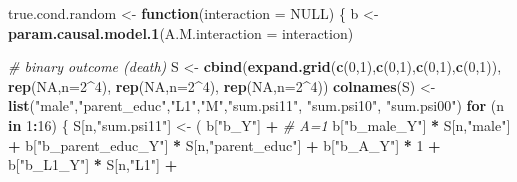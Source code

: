 \documentclass[
]{book}
\newenvironment{Shaded}{\begin{snugshade}}{\end{snugshade}}
\newcommand{\AttributeTok}[1]{\textcolor[rgb]{0.13,0.29,0.53}{#1}}
\newcommand{\CommentTok}[1]{\textcolor[rgb]{0.56,0.35,0.01}{\textit{#1}}}
\newcommand{\ConstantTok}[1]{\textcolor[rgb]{0.56,0.35,0.01}{#1}}
\newcommand{\ControlFlowTok}[1]{\textcolor[rgb]{0.13,0.29,0.53}{\textbf{#1}}}
\newcommand{\DecValTok}[1]{\textcolor[rgb]{0.00,0.00,0.81}{#1}}
\newcommand{\FunctionTok}[1]{\textcolor[rgb]{0.13,0.29,0.53}{\textbf{#1}}}
\newcommand{\NormalTok}[1]{#1}
\newcommand{\OtherTok}[1]{\textcolor[rgb]{0.56,0.35,0.01}{#1}}
\newcommand{\SpecialCharTok}[1]{\textcolor[rgb]{0.81,0.36,0.00}{\textbf{#1}}}
\newcommand{\StringTok}[1]{\textcolor[rgb]{0.31,0.60,0.02}{#1}}
\begin{document}
\begin{Shaded}
\begin{Highlighting}[]
\NormalTok{true.cond.random }\OtherTok{\textless{}{-}} \ControlFlowTok{function}\NormalTok{(}\AttributeTok{interaction =} \ConstantTok{NULL}\NormalTok{) \{}
\NormalTok{  b }\OtherTok{\textless{}{-}} \FunctionTok{param.causal.model.1}\NormalTok{(}\AttributeTok{A.M.interaction =}\NormalTok{ interaction)}
  
  \CommentTok{\# binary outcome (death)}
\NormalTok{  S }\OtherTok{\textless{}{-}} \FunctionTok{cbind}\NormalTok{(}\FunctionTok{expand.grid}\NormalTok{(}\FunctionTok{c}\NormalTok{(}\DecValTok{0}\NormalTok{,}\DecValTok{1}\NormalTok{),}\FunctionTok{c}\NormalTok{(}\DecValTok{0}\NormalTok{,}\DecValTok{1}\NormalTok{),}\FunctionTok{c}\NormalTok{(}\DecValTok{0}\NormalTok{,}\DecValTok{1}\NormalTok{),}\FunctionTok{c}\NormalTok{(}\DecValTok{0}\NormalTok{,}\DecValTok{1}\NormalTok{)), }\FunctionTok{rep}\NormalTok{(}\ConstantTok{NA}\NormalTok{,}\AttributeTok{n=}\DecValTok{2}\SpecialCharTok{\^{}}\DecValTok{4}\NormalTok{), }
             \FunctionTok{rep}\NormalTok{(}\ConstantTok{NA}\NormalTok{,}\AttributeTok{n=}\DecValTok{2}\SpecialCharTok{\^{}}\DecValTok{4}\NormalTok{), }\FunctionTok{rep}\NormalTok{(}\ConstantTok{NA}\NormalTok{,}\AttributeTok{n=}\DecValTok{2}\SpecialCharTok{\^{}}\DecValTok{4}\NormalTok{))}
  \FunctionTok{colnames}\NormalTok{(S) }\OtherTok{\textless{}{-}} \FunctionTok{list}\NormalTok{(}\StringTok{"male"}\NormalTok{,}\StringTok{"parent\_educ"}\NormalTok{,}\StringTok{"L1"}\NormalTok{,}\StringTok{"M"}\NormalTok{,}\StringTok{"sum.psi11"}\NormalTok{, }\StringTok{"sum.psi10"}\NormalTok{, }
                      \StringTok{"sum.psi00"}\NormalTok{)}
  \ControlFlowTok{for}\NormalTok{ (n }\ControlFlowTok{in} \DecValTok{1}\SpecialCharTok{:}\DecValTok{16}\NormalTok{) \{}
\NormalTok{    S[n,}\StringTok{"sum.psi11"}\NormalTok{] }\OtherTok{\textless{}{-}}\NormalTok{  ( b[}\StringTok{"b\_Y"}\NormalTok{] }\SpecialCharTok{+}                                           \CommentTok{\# A=1}
\NormalTok{                             b[}\StringTok{"b\_male\_Y"}\NormalTok{] }\SpecialCharTok{*}\NormalTok{ S[n,}\StringTok{"male"}\NormalTok{] }\SpecialCharTok{+} 
\NormalTok{                             b[}\StringTok{"b\_parent\_educ\_Y"}\NormalTok{] }\SpecialCharTok{*}\NormalTok{ S[n,}\StringTok{"parent\_educ"}\NormalTok{] }\SpecialCharTok{+} 
\NormalTok{                             b[}\StringTok{"b\_A\_Y"}\NormalTok{] }\SpecialCharTok{*} \DecValTok{1} \SpecialCharTok{+} 
\NormalTok{                             b[}\StringTok{"b\_L1\_Y"}\NormalTok{] }\SpecialCharTok{*}\NormalTok{ S[n,}\StringTok{"L1"}\NormalTok{] }\SpecialCharTok{+}

\end{Highlighting}
\end{Shaded}
\end{document}
